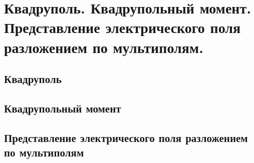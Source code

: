\chapter{Квадруполь. Квадрупольный момент. Представление электрического 
поля разложением по мультиполям.}

\section{Квадруполь}
\section{Квадрупольный момент}
\section{Представление электрического поля разложением по мультиполям}
